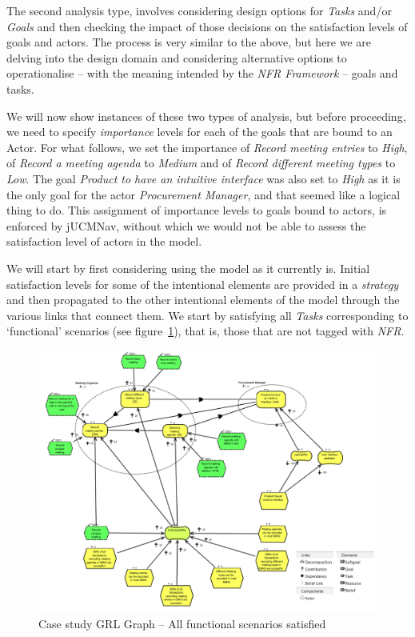 \documentclass[dissertation,final]{softeng}
\begin{document}
The second analysis type, involves considering design options for \emph{Tasks} and/or \emph{Goals} and then checking the impact of those decisions on the satisfaction levels of goals and actors. The process is very similar to the above, but here we are delving into the design domain and considering alternative options to operationalise -- with the meaning intended by the \emph{NFR Framework} -- goals and tasks.

We will now show instances of these two types of analysis, but before proceeding, we need to specify \emph{importance} levels for each of the goals that are bound to an Actor. For what follows, we set the importance of \emph{Record meeting entries} to \emph{High}, of \emph{Record a meeting agenda} to \emph{Medium} and of \emph{Record different meeting types} to \emph{Low}. The goal \emph{Product to have an intuitive interface} was also set to \emph{High} as it is the only goal for the actor \emph{Procurement Manager}, and that seemed like a logical thing to do. This assignment of importance levels to goals bound to actors, is enforced by jUCMNav, without which we would not be able to assess the satisfaction level of actors in the model.
 
We will start by first considering using the model as it currently is. Initial satisfaction levels for some of the intentional elements are provided in a \emph{strategy} and then propagated to the other intentional elements of the model through the various links that connect them. We start by satisfying all \emph{Tasks} corresponding to `functional' scenarios (see figure~\ref{fig:casestudy-functionalscenarios}), that is, those that are not tagged with \emph{NFR}.

\begin{figure}
\includegraphics[width=\columnwidth]{casestudy-functionalscenarios}
\centering
\caption{Case study GRL Graph -- All functional scenarios satisfied}
\label{fig:casestudy-functionalscenarios}
\end{figure}
\end{document}
